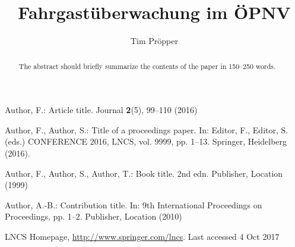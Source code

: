 \documentclass[runningheads]{llncs}
\begin{document}
%
\title{Fahrgastüberwachung im ÖPNV}

\author{Tim Pröpper}

\begin{comment}
\institute{Princeton University, Princeton NJ 08544, USA \and
    Springer Heidelberg, Tiergartenstr. 17, 69121 Heidelberg, Germany
    \email{lncs@springer.com}\\
    \url{http://www.springer.com/gp/computer-science/lncs} \and
    ABC Institute, Rupert-Karls-University Heidelberg, Heidelberg, Germany\\
    \email{\{abc,lncs\}@uni-heidelberg.de}}

\end{comment}
\maketitle              %
%
\begin{abstract}
    The abstract should briefly summarize the contents of the paper in
    150--250 words.

\end{abstract}
%
%
%




\begin{thebibliography}{99}
    Author, F.: Article title. Journal \textbf{2}(5), 99--110 (2016)

    Author, F., Author, S.: Title of a proceedings paper. In: Editor,
    F., Editor, S. (eds.) CONFERENCE 2016, LNCS, vol. 9999, pp. 1--13.
    Springer, Heidelberg (2016). 

    Author, F., Author, S., Author, T.: Book title. 2nd edn. Publisher,
    Location (1999)

    Author, A.-B.: Contribution title. In: 9th International Proceedings
    on Proceedings, pp. 1--2. Publisher, Location (2010)

    LNCS Homepage, \url{http://www.springer.com/lncs}. Last accessed 4
    Oct 2017
\end{thebibliography}
\end{document}
